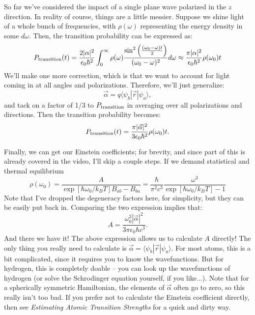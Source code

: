 \documentclass{article}
\begin{document}
So far we've considered the impact of a single plane wave polarized in the $z$ direction. In reality of course, things are a little messier. Suppose we shine light of a whole bunch of frequencies, with $\rho(\omega)$ representing the energy density in some $d\omega$. Then, the transition probability can be expressed as:
\begin{equation}
P_{\rm transition}(t) = \frac{2|\alpha|^2}{\epsilon_0\hbar^2}\int_0^{\infty} \rho(\omega) \frac{\sin^2\left(\frac{(\omega_0 - \omega)t}{2}\right)}{(\omega_0 - \omega)^2} d\omega \approx \frac{\pi|\alpha|^2}{\epsilon_0\hbar^2}\rho(\omega_0)t
\end{equation}
We'll make one more correction, which is that we want to account for light coming in at all angles and polarizations. Therefore, we'll just generalize:
\begin{equation}
\vec{\alpha} = q\langle \psi_b | \vec{r} | \psi_a \rangle,
\end{equation}
and tack on a factor of 1/3 to $P_{\rm transition}$ in averaging over all polarizations and directions. Then the transition probability becomes:
\begin{equation}
P_{\rm transition}(t) = \frac{\pi|\vec{\alpha}|^2}{3\epsilon_0\hbar^2}\rho(\omega_0)t.
\end{equation}

Finally, we can get our Einstein coefficients; for brevity, and since part of this is already covered in the video, I'll skip a couple steps. If we demand statistical and thermal equilibrium
\begin{equation}
\rho(\omega_0) = \frac{A}{\exp[\hbar\omega_0/k_BT]B_{ab}-B_{ba}} = \frac{\hbar}{\pi^2c^3}\frac{\omega^3}{\exp[\hbar\omega_0/k_BT]-1}
\end{equation}
Note that I've dropped the degeneracy factors here, for simplicity, but they can be easily put back in. Comparing the two expression implies that:
\begin{equation}
A = \frac{\omega^3_0 |\vec{\alpha}|^2}{3\pi\epsilon_0\hbar c^3}.
\end{equation}
And there we have it! The above expression allows us to calculate $A$ directly! The only thing you really need to calculate is $\vec{\alpha} = \langle \psi_b | \vec{r} | \psi_a \rangle$. For most atoms, this is a bit complicated, since it requires you to know the wavefunctions. But for hydrogen, this is completely doable -- you can look up the wavefunctions of hydrogen (or solve the Schrodinger equation yourself, if you like...). Note that for a spherically symmetric Hamiltonian, the elements of $\vec{\alpha}$ often go to zero, so this really isn't too bad. If you prefer not to calculate the Einstein coefficient directly, then see \textit{Estimating Atomic Transition Strengths} for a quick and dirty way.
\end{document}
